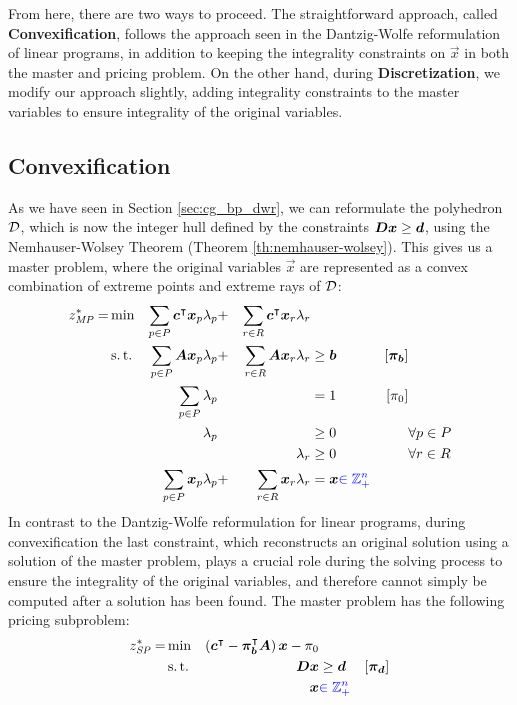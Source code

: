 From here, there are two ways to proceed. The straightforward approach, called \textbf{Convexification}, follows the approach seen in the Dantzig-Wolfe reformulation of linear programs, in addition to keeping the integrality constraints on $\vec{x}$ in both the master and pricing problem. On the other hand, during \textbf{Discretization}, we modify our approach slightly, adding integrality constraints to the master variables to ensure integrality of the original variables.

\subsection{Convexification}\label{sec:cg_bp_ip_convexification}
As we have seen in Section \ref{sec:cg_bp_dwr}, we can reformulate the polyhedron $\mathcal{D}$, which is now the integer hull defined by the constraints ${\bm{D}} {\bm{x}} \geq {\bm{d}}$, using the Nemhauser-Wolsey Theorem (Theorem \ref{th:nemhauser-wolsey}). This gives us a master problem, where the original variables $\vec{x}$ are represented as a convex combination of extreme points and extreme rays of $\mathcal{D}$:
\begin{equation}
\begin{aligned}
z^*_{\textit{MP}}{} = &\min & \sum_{p \in P} {\bm{c}}^\intercal {\bm{x}}_p \lambda_p &+ &\sum_{r \in R} {\bm{c}}^\intercal {\bm{x}}_r \lambda_r & & & \\
&\operatorname{s.t.} & \sum_{p \in P} {\bm{A}} {\bm{x}}_p \lambda_p &+ &\sum_{r \in R} {\bm{A}} {\bm{x}}_r \lambda_r & \geq {\bm{b}} & \left[{\bm{\pi}}_{\bm{b}}\right] \\
&& \sum_{p \in P} \lambda_p & & & = 1 & \left[\pi_0 \right] & \\
&& \lambda_p & & & \geq 0 & & \forall p \in P \\
&& & & \lambda_r & \geq 0 & & \forall r \in R \\
&& \sum_{p \in P} {\bm{x}}_p \lambda_p &+ &\sum_{r \in R} {\bm{x}}_r \lambda_r & = {\bm{x}} {\color{blue} \in \mathbb{Z}_+^n} & &
\end{aligned}
\end{equation}
In contrast to the Dantzig-Wolfe reformulation for linear programs, during convexification the last constraint, which reconstructs an original solution using a solution of the master problem, plays a crucial role during the solving process to ensure the integrality of the original variables, and therefore cannot simply be computed after a solution has been found. The master problem has the following pricing subproblem:
\begin{equation}
\begin{aligned}
z^*_\SP{} = &\min & \left( \vec{c}\transpose - \vec{\pi}_\vec{b}\transpose \mat{A} \right) \vec{x} - \pi_0 & & \\
&\st & \mat{D} \vec{x} & \geq \vec{d} & \left[\vec{\pi}_\vec{d}\right] \\
&& \vec{x} & {\color{blue} \in \mathbb{Z}_+^n}
\end{aligned}
\end{equation}

